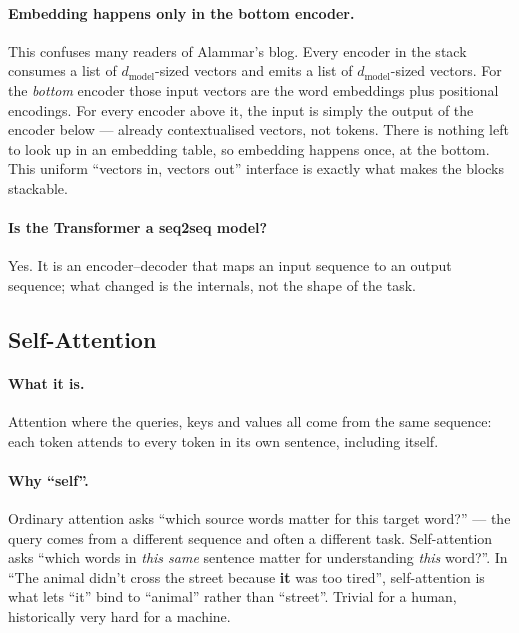 \documentclass[11pt,a4paper]{article}
\begin{document}
\paragraph{Embedding happens only in the bottom encoder.} This confuses many readers of
Alammar's blog. Every encoder in the stack consumes a list of $d_{\text{model}}$-sized vectors
and emits a list of $d_{\text{model}}$-sized vectors. For the \emph{bottom} encoder those
input vectors are the word embeddings plus positional encodings. For every encoder above it,
the input is simply the output of the encoder below --- already contextualised vectors, not
tokens. There is nothing left to look up in an embedding table, so embedding happens once, at
the bottom. This uniform ``vectors in, vectors out'' interface is exactly what makes the
blocks stackable.

\paragraph{Is the Transformer a seq2seq model?} Yes. It is an encoder--decoder that maps an
input sequence to an output sequence; what changed is the internals, not the shape of the
task.

\subsection{Self-Attention}

\paragraph{What it is.} Attention where the queries, keys and values all come from the same
sequence: each token attends to every token in its own sentence, including itself.

\paragraph{Why ``self''.} Ordinary attention asks ``which source words matter for this
target word?'' --- the query comes from a different sequence and often a different task.
Self-attention asks ``which words in \emph{this same} sentence matter for understanding
\emph{this} word?''. In ``The animal didn't cross the street because \textbf{it} was too
tired'', self-attention is what lets ``it'' bind to ``animal'' rather than ``street''.
Trivial for a human, historically very hard for a machine.
\end{document}
